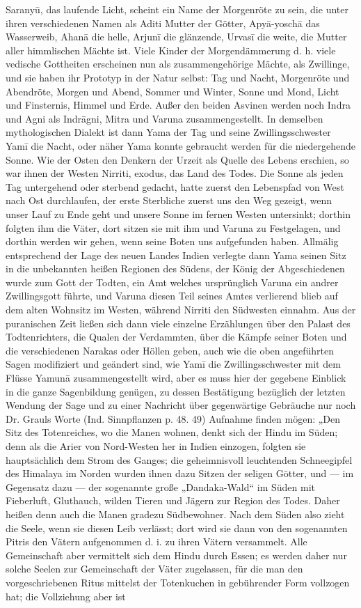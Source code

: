\documentclass{article}
\begin{document}
Sarany\={u}, das laufende Licht, scheint ein Name der Morgenröte zu sein, die unter ihren verschiedenen Namen als Aditi Mutter der Götter, Apy\={a}-yosch\={a} das Wasserweib, Ahan\={a} die helle, Arjun\={i} die glänzende, Urvas\={i} die weite, die Mutter aller himmlischen Mächte ist. Viele Kinder der Morgendämmerung d. h. viele vedische Gottheiten erscheinen nun als zusammengehörige Mächte, als Zwillinge, und sie haben ihr Prototyp in der Natur selbst: Tag und Nacht, Morgenröte und Abendröte, Morgen und Abend, Sommer und Winter, Sonne und Mond, Licht und Finsternis, Himmel und Erde. Außer den beiden Asvinen werden noch Indra und Agni als Indr\={a}gni, Mitra und Varuna zusammengestellt. In demselben mythologischen Dialekt ist dann Yama der Tag und seine Zwillingsschwester Yam\={i} die Nacht, oder näher Yama konnte gebraucht werden für die niedergehende Sonne. Wie der Osten den Denkern der Urzeit als Quelle des Lebens erschien, so war ihnen der Westen Nirriti, exodus, das Land des Todes. Die Sonne als jeden Tag untergehend oder sterbend gedacht, hatte zuerst den Lebenspfad von West nach Ost durchlaufen, der erste Sterbliche zuerst uns den Weg gezeigt, wenn unser Lauf zu Ende geht und unsere Sonne im fernen Westen untersinkt; dorthin folgten ihm die Väter, dort sitzen sie mit ihm und Varuna zu Festgelagen, und dorthin werden wir gehen, wenn seine Boten uns aufgefunden haben. Allmälig entsprechend der Lage des neuen Landes Indien verlegte dann Yama seinen Sitz in die unbekannten heißen Regionen des Südens, der König der Abgeschiedenen wurde zum Gott der Todten, ein Amt welches ursprünglich Varuna ein andrer Zwillingsgott führte, und Varuna diesen Teil seines Amtes verlierend blieb auf dem alten Wohnsitz im Westen, während Nirriti den Südwesten einnahm. Aus der puranischen Zeit ließen sich dann viele einzelne Erzählungen über den Palast des Todtenrichters, die Qualen der Verdammten, über die Kämpfe seiner Boten und die verschiedenen Narakas oder Höllen geben, auch wie die oben angeführten Sagen modifiziert und geändert sind, wie Yam\={i} die Zwillingsschwester mit dem Flüsse Yamun\={a} zusammengestellt wird, aber es muss hier der gegebene Einblick in die ganze Sagenbildung genügen, zu dessen Bestätigung bezüglich der letzten Wendung der Sage und zu einer Nachricht über gegenwärtige Gebräuche nur noch Dr. Grauls Worte (Ind. Sinnpflanzen p. 48. 49) Aufnahme finden mögen: „Den Sitz des Totenreiches, wo die Manen wohnen, denkt sich der Hindu im Süden; denn als die Arier von Nord-Westen her in Indien einzogen, folgten sie hauptsächlich dem Strom des Ganges; die geheimnisvoll leuchtenden Schneegipfel des Himalaya im Norden wurden ihnen dazu Sitzen der seligen Götter, und — im Gegensatz dazu — der sogenannte große „Dandaka-Wald“ im Süden mit Fieberluft, Gluthauch, wilden Tieren und Jägern zur Region des Todes. Daher heißen denn auch die Manen gradezu Südbewohner. Nach dem Süden also zieht die Seele, wenn sie diesen Leib verlässt; dort wird sie dann von den sogenannten Pitris den Vätern aufgenommen d. i. zu ihren Vätern versammelt. Alle Gemeinschaft aber vermittelt sich dem Hindu durch Essen; es werden daher nur solche Seelen zur Gemeinschaft der Väter zugelassen, für die man den vorgeschriebenen Ritus mittelst der Totenkuchen in gebührender Form vollzogen hat; die Vollziehung aber ist 
\end{document}
